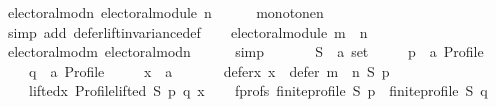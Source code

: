 \begin{isabellebody}
\ electoral{\isacharunderscore}{\kern0pt}mod{\isacharunderscore}{\kern0pt}n{\isacharcolon}{\kern0pt}\ {\isachardoublequoteopen}electoral{\isacharunderscore}{\kern0pt}module\ n{\isachardoublequoteclose}\isanewline
\ \ \ \ \isamarkupfalse%
\ monotone{\isacharunderscore}{\kern0pt}n\isanewline
\ \ \ \ \isamarkupfalse%
\ {\isacharparenleft}{\kern0pt}simp\ add{\isacharcolon}{\kern0pt}\ defer{\isacharunderscore}{\kern0pt}lift{\isacharunderscore}{\kern0pt}invariance{\isacharunderscore}{\kern0pt}def{\isacharparenright}{\kern0pt}\isanewline
\ \ \isamarkupfalse%
\ {\isachardoublequoteopen}electoral{\isacharunderscore}{\kern0pt}module\ {\isacharparenleft}{\kern0pt}m\ {\isasymparallel}\isactrlsub {\isasymup}\ n{\isacharparenright}{\kern0pt}{\isachardoublequoteclose}\isanewline
\ \ \ \ \isamarkupfalse%
\ electoral{\isacharunderscore}{\kern0pt}mod{\isacharunderscore}{\kern0pt}m\ electoral{\isacharunderscore}{\kern0pt}mod{\isacharunderscore}{\kern0pt}n\isanewline
\ \ \ \ \isamarkupfalse%
\ simp\isanewline
{}\isamarkupfalse%
\isanewline
\ \ \isamarkupfalse%
\isanewline
\ \ \ \ S\ {\isacharcolon}{\kern0pt}{\isacharcolon}{\kern0pt}\ {\isachardoublequoteopen}{\isacharprime}{\kern0pt}a\ set{\isachardoublequoteclose}\ \isanewline
\ \ \ \ p\ {\isacharcolon}{\kern0pt}{\isacharcolon}{\kern0pt}\ {\isachardoublequoteopen}{\isacharprime}{\kern0pt}a\ Profile{\isachardoublequoteclose}\ \isanewline
\ \ \ \ q\ {\isacharcolon}{\kern0pt}{\isacharcolon}{\kern0pt}\ {\isachardoublequoteopen}{\isacharprime}{\kern0pt}a\ Profile{\isachardoublequoteclose}\ \isanewline
\ \ \ \ x\ {\isacharcolon}{\kern0pt}{\isacharcolon}{\kern0pt}\ {\isachardoublequoteopen}{\isacharprime}{\kern0pt}a{\isachardoublequoteclose}\isanewline
\ \ \isamarkupfalse%
\isanewline
\ \ \ \ defer{\isacharunderscore}{\kern0pt}x{\isacharcolon}{\kern0pt}\ {\isachardoublequoteopen}x\ {\isasymin}\ defer\ {\isacharparenleft}{\kern0pt}m\ {\isasymparallel}\isactrlsub {\isasymup}\ n{\isacharparenright}{\kern0pt}\ S\ p{\isachardoublequoteclose}\ \isanewline
\ \ \ \ lifted{\isacharunderscore}{\kern0pt}x{\isacharcolon}{\kern0pt}\ {\isachardoublequoteopen}Profile{\isachardot}{\kern0pt}lifted\ S\ p\ q\ x{\isachardoublequoteclose}\isanewline
\ \ \isamarkupfalse%
\ f{\isacharunderscore}{\kern0pt}profs{\isacharcolon}{\kern0pt}\ {\isachardoublequoteopen}finite{\isacharunderscore}{\kern0pt}profile\ S\ p\ {\isasymand}\ finite{\isacharunderscore}{\kern0pt}profile\ S\ q{\isachardoublequoteclose}\isanewline

\end{isabellebody}
